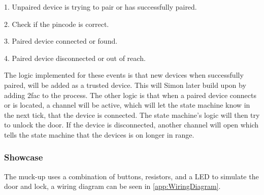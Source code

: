 1. Unpaired device is trying to pair or has successfully paired.

2. Check if the pincode is correct.

3. Paired device connected or found.

4. Paired device disconnected or out of reach.
\newline

The logic implemented for these events is that new devices when successfully paired, will be added as a trusted device.
This will Simon later build upon by adding 2fac to the process.
The other logic is that when a paired device connects or is located, a channel will be active, which will let the state machine know in the next tick, that the device is connected.
The state machine's logic will then try to unlock the door.
If the device is disconnected, another channel will open which tells the state machine that the devices is on longer in range.

\subsubsection{Showcase}
The muck-up uses a combination of buttons, resistors, and a LED to simulate the door and lock, a wiring diagram can be seen in \ref{app:WiringDiagram}.
